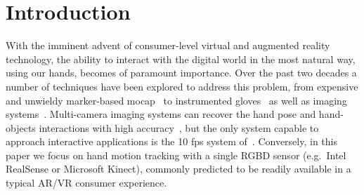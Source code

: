 % 
% 
% 
% 



\section{Introduction}
With the imminent advent of consumer-level virtual and augmented reality technology, the ability to interact with the digital world in the most natural way, using our hands, becomes of paramount importance. 
% 
%
%
% 
%
Over the past two decades  a number of techniques have been explored to address this problem, from expensive and unwieldy marker-based mocap~\cite{mocapsurvey} to instrumented gloves~\cite{dipietro2008survey} as well as imaging systems~\cite{erol2007survey}. Multi-camera imaging systems can recover the hand pose and hand-objects interactions with high accuracy~\cite{ballan2013salient}, but the only system capable to approach interactive applications is the 10 fps system of~\cite{sridhar2013multicam}. Conversely, in this paper we focus on hand motion tracking with a single RGBD sensor (e.g.\ Intel RealSense or Microsoft Kinect), commonly predicted to be readily available in a typical AR/VR consumer experience.

